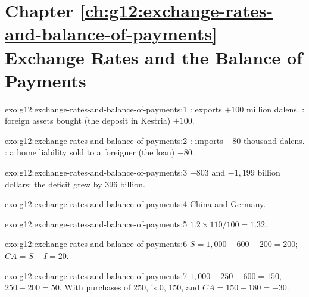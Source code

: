 \section*{Chapter \ref{ch:g12:exchange-rates-and-balance-of-payments} --- Exchange Rates and the Balance of Payments}

\begin{solution}{exo:g12:exchange-rates-and-balance-of-payments:1}
: exports $+100$ million dalens. : foreign assets bought (the deposit in Kestria) $+100$.
\end{solution}

\begin{solution}{exo:g12:exchange-rates-and-balance-of-payments:2}
: imports $-80$ thousand dalens. : a home liability sold to a foreigner (the loan) $-80$.
\end{solution}

\begin{solution}{exo:g12:exchange-rates-and-balance-of-payments:3}
$-803$ and $-1{,}199$ billion dollars: the deficit grew by 396 billion.
\end{solution}

\begin{solution}{exo:g12:exchange-rates-and-balance-of-payments:4}
China and Germany.
\end{solution}

\begin{solution}{exo:g12:exchange-rates-and-balance-of-payments:5}
$1.2 \times 110/100 = 1.32$.
\end{solution}

\begin{solution}{exo:g12:exchange-rates-and-balance-of-payments:6}
$S = 1{,}000 - 600 - 200 = 200$; $CA = S - I = 20$.
\end{solution}

\begin{solution}{exo:g12:exchange-rates-and-balance-of-payments:7}
 $1{,}000 - 250 - 600 = 150$,  $250 - 200 = 50$. With purchases of 250,  is 0,  150, and $CA = 150 - 180 = -30$.
\end{solution}

